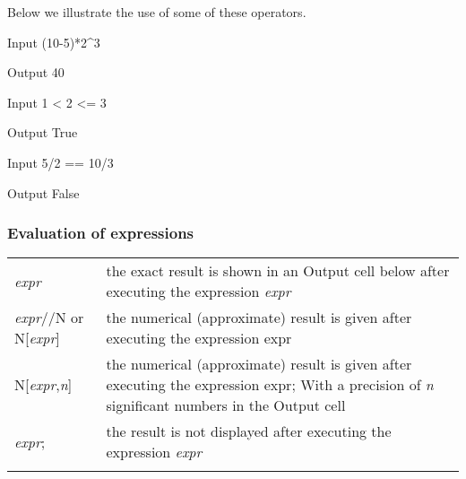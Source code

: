 Below we illustrate the use of some of these operators. 


\begin{mdframed}[default,backgroundcolor=gray!40,roundcorner=8pt]
	\begin{mmaCell}[]{Input}
		(10-5)*2\^{}3
	\end{mmaCell}
	\begin{mmaCell}[]{Output}
		40
	\end{mmaCell}


	\begin{mmaCell}[]{Input}
		1 < 2 <= 3
	\end{mmaCell}
	\begin{mmaCell}[]{Output}
		True
	\end{mmaCell}


	\begin{mmaCell}[]{Input}
		5/2 == 10/3
	\end{mmaCell}
	\begin{mmaCell}[]{Output}
		False
	\end{mmaCell}
\end{mdframed}


\subsubsection{Evaluation of expressions}

\begin{tabular}{>{\hfill}p{5cm}p{12cm}}
	\textit{expr} 			&	the exact result is shown in an Output cell below after executing the expression \textit{expr} \\
	\textit{expr}//N or N[\textit{expr}]	&	the numerical (approximate) result is given after executing the expression expr \\
	N[\textit{expr},\textit{n}]			&	the numerical (approximate) result is given after executing the expression expr;
	With a precision of \textit{n} significant numbers in the Output cell\\
	\textit{expr}; 			&	the result is not displayed after executing the expression  \textit{expr} \\
	\multicolumn{2}{l}{} 
\end{tabular}
%
%
%
%	
%	
%

